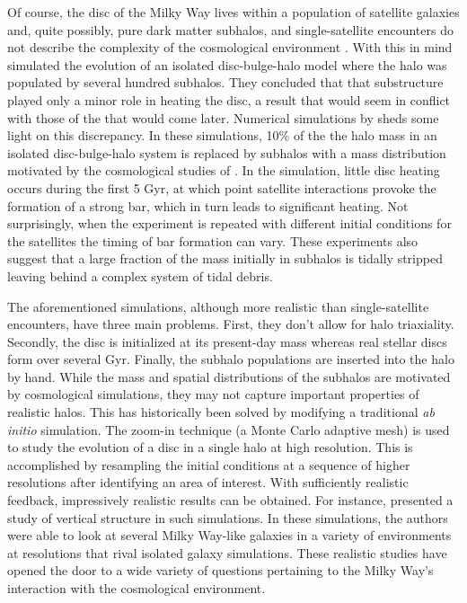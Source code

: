 Of course, the disc of the Milky Way lives within a population of satellite galaxies and, quite possibly, pure dark matter subhalos, and single-satellite encounters do not describe the complexity of the cosmological environment \citep{Klypin1999,mooresubhalos,springel2008}.  With this in mind \citet{Font2001} simulated the evolution of an isolated disc-bulge-halo model where the halo was populated by several hundred subhalos.  They concluded that that substructure played only a minor role in heating the disc, a result that would seem in conflict with those of the \citet{kazantzidis2008} that would come later.  Numerical simulations by \citet{gauthier2006, dubinski2008} sheds some light on this discrepancy.  In these simulations, 10\% of the the halo mass in an isolated disc-bulge-halo system is replaced by subhalos with a mass distribution motivated by the cosmological studies of \citet{gao2004}.  In the \citet{gauthier2006} simulation, little disc heating occurs during the first 5 Gyr, at which point satellite interactions provoke the formation of a strong bar, which in turn leads to significant heating.  Not surprisingly, when the experiment is repeated with different initial conditions for the satellites the timing of bar formation can vary.  These experiments also suggest that a large fraction of the mass initially in subhalos is tidally stripped leaving behind a complex system of tidal debris.

The aforementioned simulations, although more realistic than single-satellite encounters, have three main problems.  First, they don't allow for halo triaxiality.  Secondly, the disc is initialized at its present-day mass whereas real stellar discs form over several Gyr.  Finally, the subhalo populations are inserted into the halo by hand.  While the mass and spatial distributions of the subhalos are motivated by cosmological simulations, they may not capture important properties of realistic halos. This has historically been solved by modifying a traditional \textit{ab initio} simulation. The zoom-in technique (a Monte Carlo adaptive mesh) is used to study the evolution of a disc in a single halo at high resolution.  This is accomplished by resampling the initial conditions at a sequence of higher resolutions after identifying an area of interest. With sufficiently realistic feedback, impressively realistic results can be obtained. For instance, \citet{gomez_2017} presented a study of vertical structure in such simulations. In these simulations, the authors were able to look at several Milky Way-like galaxies in a variety of environments at resolutions that rival isolated galaxy simulations. These realistic studies have opened the door to a wide variety of questions pertaining to the Milky Way's interaction with the cosmological environment.


